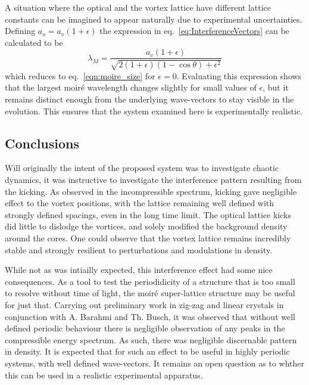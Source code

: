     A situation where the optical and the vortex lattice have different lattice constants can be imagined to appear naturally due to experimental uncertainties. Defining $a_o = a_v(1+\epsilon)$ the expression in eq.~\eqref{eq:InterferenceVectors} can be calculated to be
    \begin{equation}
    	\lambda_M = \frac{a_v(1+\epsilon)}{\sqrt{2(1+\epsilon)(1-\cos\theta) + \epsilon^2}}
    	\label{eqn:moire_size_eps}
    \end{equation}
    which reduces to eq.~\eqref{eqn:moire_size} for $\epsilon=0$. Evaluating this expression shows that the largest moir\'e wavelength changes slightly for small values of $\epsilon$, but it remains distinct enough from the underlying wave-vectors to stay visible in the evolution. This ensures that the system examined here is experimentally realistic.

\subsection{Conclusions}
\label{subs:ch4_conc}
Will originally the intent of the proposed system was to investigate chaotic dynamics, it was instructive to investigate the interference pattern resulting from the kicking. As observed in the incompressible spectrum, kicking gave negligible effect to the vortex positions, with the lattice remaining well defined with strongly defined spacings, even in the long time limit. The optical lattice kicks did little to dislodge the vortices, and solely modified the background density around the cores. One could observe that the vortex lattice remains incredibly stable and strongly resilient to perturbations and modulations in density.

While not as was intiailly expected, this interference effect had some nice consequences. As a tool to test the periodidicity of a structure that is too small to resolve without time of light, the moir\'e super-lattice structure may be useful for just that. Carrying out preliminary work in zig-zag and linear crystals in conjunction with A. Barahmi and Th. Busch, it was observed that without well defined periodic behaviour there is negligible observation of any peaks in the compressible energy spectrum. As such, there was negligible discernable pattern in density. It is expected that for such an effect to be useful in highly periodic systems, with well defined wave-vectors. It remains an open question as to whther this can be used in a realistic experimental apparatus.




